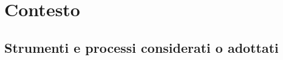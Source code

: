 \section{Contesto}\label{contesto}

\subsection{Strumenti e processi considerati o
adottati}\label{strumenti-e-processi-considerati-o-adottati}
